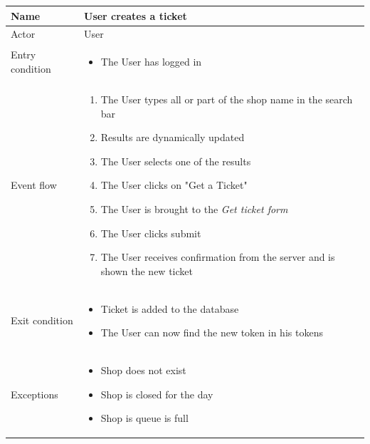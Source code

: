 \begin{table}[H]
    \begin{tabularx}{\textwidth}{|X|p{}|}
    \hline
    Name           & User creates a ticket   \\ \hline
    Actor          & User \\ \hline
    Entry condition & \begin{itemize}
        \item The User has logged in
    \end{itemize}\\ \hline
    Event flow     & \begin{enumerate}
        \item The User types all or part of the shop name in the search bar
        \item Results are dynamically updated
        \item The User selects one of the results
        \item The User clicks on "Get a Ticket"
        \item The User is brought to the \emph{Get ticket form}
        \item The User clicks submit
        \item The User receives confirmation from the server and is shown the new ticket
    \end{enumerate} \\ \hline
    Exit condition & \begin{itemize}
        \item Ticket is added to the database
        \item The User can now find the new token in his tokens
    \end{itemize}\\ \hline
    Exceptions & \begin{itemize}
        \item Shop does not exist
        \item Shop is closed for the day
        \item Shop is queue is full
    \end{itemize} \\ \hline
    \end{tabularx}
\end{table}

